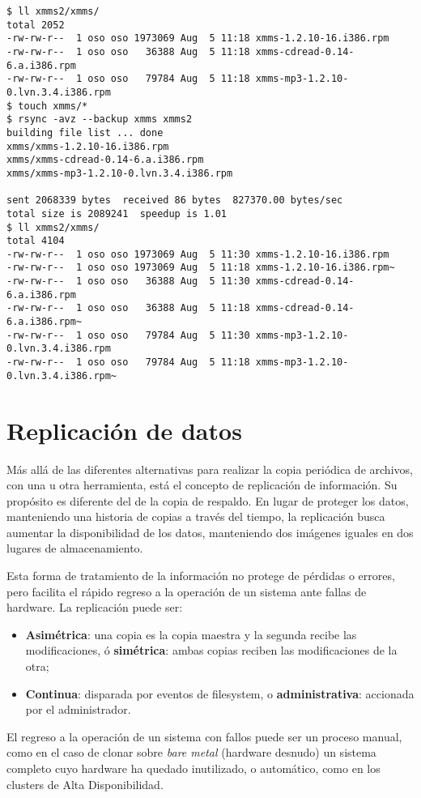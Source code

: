 \begin{lstlisting}
$ ll xmms2/xmms/
total 2052
-rw-rw-r--  1 oso oso 1973069 Aug  5 11:18 xmms-1.2.10-16.i386.rpm
-rw-rw-r--  1 oso oso   36388 Aug  5 11:18 xmms-cdread-0.14-6.a.i386.rpm
-rw-rw-r--  1 oso oso   79784 Aug  5 11:18 xmms-mp3-1.2.10-0.lvn.3.4.i386.rpm
$ touch xmms/*
$ rsync -avz --backup xmms xmms2
building file list ... done
xmms/xmms-1.2.10-16.i386.rpm
xmms/xmms-cdread-0.14-6.a.i386.rpm
xmms/xmms-mp3-1.2.10-0.lvn.3.4.i386.rpm

sent 2068339 bytes  received 86 bytes  827370.00 bytes/sec
total size is 2089241  speedup is 1.01
$ ll xmms2/xmms/
total 4104
-rw-rw-r--  1 oso oso 1973069 Aug  5 11:30 xmms-1.2.10-16.i386.rpm
-rw-rw-r--  1 oso oso 1973069 Aug  5 11:18 xmms-1.2.10-16.i386.rpm~
-rw-rw-r--  1 oso oso   36388 Aug  5 11:30 xmms-cdread-0.14-6.a.i386.rpm
-rw-rw-r--  1 oso oso   36388 Aug  5 11:18 xmms-cdread-0.14-6.a.i386.rpm~
-rw-rw-r--  1 oso oso   79784 Aug  5 11:30 xmms-mp3-1.2.10-0.lvn.3.4.i386.rpm
-rw-rw-r--  1 oso oso   79784 Aug  5 11:18 xmms-mp3-1.2.10-0.lvn.3.4.i386.rpm~
\end{lstlisting}

\section{Replicación de datos} 
Más allá de las diferentes alternativas para realizar la copia periódica de archivos, 
con una u otra herramienta, está el concepto de replicación de información. Su propósito 
es diferente del de la copia de respaldo. En lugar de proteger los datos, manteniendo una 
historia de copias a través del tiempo, la replicación busca aumentar la disponibilidad 
de los datos, manteniendo dos imágenes iguales en dos lugares de almacenamiento. 

Esta forma de tratamiento de la información no protege de pérdidas o errores, pero facilita 
el rápido regreso a la operación de un sistema ante fallas de hardware. La replicación puede ser:
\begin{itemize} 
   \item {\bf Asimétrica}: una copia es la copia maestra y la segunda recibe las modificaciones, ó {\bf simétrica}: ambas copias reciben las modificaciones de la otra;
   \item {\bf Continua}: disparada por eventos de filesystem, o {\bf administrativa}: accionada por el administrador. 
\end{itemize}

El regreso a la operación de un sistema con fallos puede ser un proceso manual, como en el caso 
de clonar sobre \emph{bare metal} (hardware desnudo) un sistema completo cuyo hardware ha quedado 
inutilizado, o automático, como en los clusters de Alta Disponibilidad.

